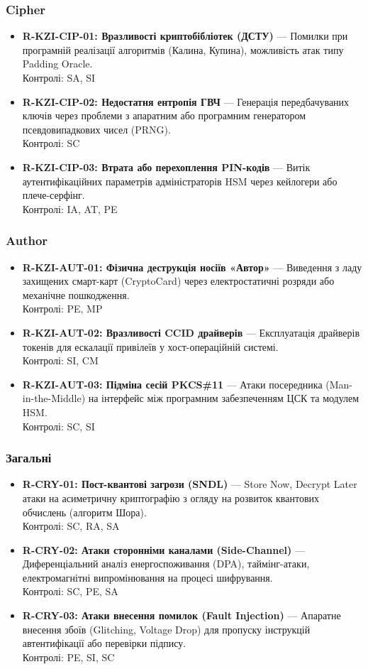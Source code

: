 \documentclass{article}
\begin{document}
\subsubsection{Cipher}
\begin{itemize}
\item \textbf{R-KZI-CIP-01: Вразливості криптобібліотек (ДСТУ)} — Помилки при програмній реалізації алгоритмів (Калина, Купина), можливість атак типу Padding Oracle.
\\ Контролі: SA, SI
\item \textbf{R-KZI-CIP-02: Недостатня ентропія ГВЧ} — Генерація передбачуваних ключів через проблеми з апаратним або програмним генератором псевдовипадкових чисел (PRNG).
\\ Контролі: SC
\item \textbf{R-KZI-CIP-03: Втрата або перехоплення PIN-кодів} — Витік аутентифікаційних параметрів адміністраторів HSM через кейлогери або плече-серфінг.
\\ Контролі: IA, AT, PE\end{itemize}
\subsubsection{Author}
\begin{itemize}
\item \textbf{R-KZI-AUT-01: Фізична деструкція носіїв «Автор»} — Виведення з ладу захищених смарт-карт (CryptoCard) через електростатичні розряди або механічне пошкодження.
\\ Контролі: PE, MP
\item \textbf{R-KZI-AUT-02: Вразливості CCID драйверів} — Експлуатація драйверів токенів для ескалації привілеїв у хост-операційній системі.
\\ Контролі: SI, CM
\item \textbf{R-KZI-AUT-03: Підміна сесій PKCS\#11} — Атаки посередника (Man-in-the-Middle) на інтерфейс між програмним забезпеченням ЦСК та модулем HSM.
\\ Контролі: SC, SI\end{itemize}
\subsubsection{Загальні}
\begin{itemize}
\item \textbf{R-CRY-01: Пост-квантові загрози (SNDL)} — Store Now, Decrypt Later атаки на асиметричну криптографію з огляду на розвиток квантових обчислень (алгоритм Шора).
\\ Контролі: SC, RA, SA
\item \textbf{R-CRY-02: Атаки сторонніми каналами (Side-Channel)} — Диференціальний аналіз енергоспоживання (DPA), таймінг-атаки, електромагнітні випромінювання на процесі шифрування.
\\ Контролі: SC, PE, SA
\item \textbf{R-CRY-03: Атаки внесення помилок (Fault Injection)} — Апаратне внесення збоїв (Glitching, Voltage Drop) для пропуску інструкцій автентифікації або перевірки підпису.
\\ Контролі: PE, SI, SC\end{itemize}
\end{document}
